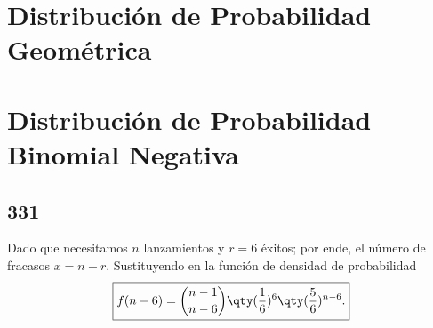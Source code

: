 \section{Distribución de Probabilidad Geométrica}
\section{Distribución de Probabilidad Binomial Negativa}
\subsection*{331}
Dado que necesitamos $n$ lanzamientos y $r = 6$ éxitos; por ende, el número de fracasos $x = n - r$. Sustituyendo en la función de densidad de probabilidad
	$$\boxed{f(n - 6) = \binom{n - 1}{n - 6} \qty(\frac{1}{6})^6 \qty(\frac{5}{6})^{n - 6} .}$$
